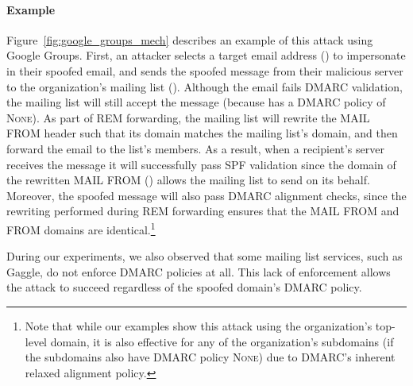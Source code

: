 \paragraph{Example}
Figure~\ref{fig:google_groups_mech} describes an example of this attack
using Google Groups.
First, an attacker selects a target email address () to impersonate in their spoofed email,
and sends the spoofed message from their malicious server to the organization's mailing list ().
Although the email fails DMARC validation,
the mailing list will still accept the message (because 
has a DMARC policy of \textsc{None}).
As part of REM forwarding, the mailing list will rewrite the
\textsc{MAIL FROM} header such that its domain matches the mailing
list's domain, and then forward the email to the list's members.
As a result, when a recipient's server receives the message it will
successfully pass SPF validation since the domain of the rewritten
\textsc{MAIL FROM} () allows the mailing list to send on
its behalf.
Moreover, the spoofed message will also pass DMARC alignment checks,
since the rewriting performed during REM forwarding
ensures that the \textsc{MAIL FROM} and \textsc{FROM} domains are
identical.\footnote{Note that while our examples show this attack
using the organization's top-level domain, it is also effective for
any of the organization's subdomains (if the subdomains also have
DMARC policy \textsc{None}) due to DMARC's inherent relaxed alignment policy.}

During our experiments, we also observed that some mailing list
services, such as Gaggle, do not enforce DMARC policies at all.
This lack of enforcement allows the attack to succeed regardless of the spoofed domain's DMARC policy.




